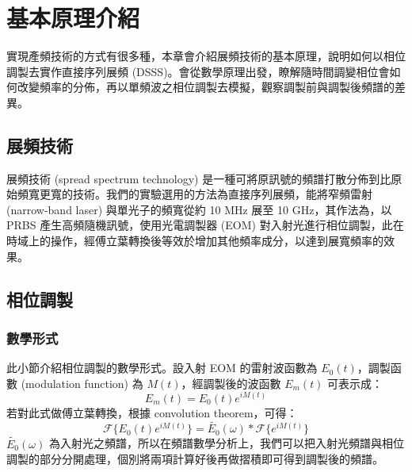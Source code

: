 \documentclass[class=NCU_thesis, crop=false]{standalone}
\begin{document}
\chapter{基本原理介紹}
實現產頻技術的方式有很多種，本章會介紹展頻技術的基本原理，說明如何以相位調製去實作直接序列展頻 (DSSS)。會從數學原理出發，瞭解隨時間調變相位會如何改變頻率的分佈，再以單頻波之相位調製去模擬，觀察調製前與調製後頻譜的差異。

\section{展頻技術}

展頻技術 (spread spectrum technology) 是一種可將原訊號的頻譜打散分佈到比原始頻寬更寬的技術。我們的實驗選用的方法為直接序列展頻，能將窄頻雷射 (narrow-band laser) 與單光子的頻寬從約 10 MHz 展至 10 GHz，其作法為，以 PRBS 產生高頻隨機訊號，使用光電調製器 (EOM) 對入射光進行相位調製，此在時域上的操作，經傅立葉轉換後等效於增加其他頻率成分，以達到展寬頻率的效果。
\section{相位調製}

\subsection{數學形式}
此小節介紹相位調製的數學形式。設入射 EOM 的雷射波函數為 $E_{0}(t)$，調製函數 (modulation function) 為 $M(t)$，經調製後的波函數 $E_{m}(t)$ 可表示成：
\begin{equation}
    E_{m}(t)=E_{0}(t)e^{iM(t)}
\end{equation}
若對此式做傅立葉轉換，根據 convolution theorem，可得：
\begin{equation}
\label{eq:modulation_function}
    \mathscr{F}\{E_{0}(t)e^{iM(t)}\}=\tilde{E_{0}}(\omega)*\mathscr{F}\{{e^{iM(t)}}\}
\end{equation}
$\tilde{E_{0}}(\omega)$ 為入射光之頻譜，所以在頻譜數學分析上，我們可以把入射光頻譜與相位調製的部分分開處理，個別將兩項計算好後再做摺積即可得到調製後的頻譜。
\end{document}
